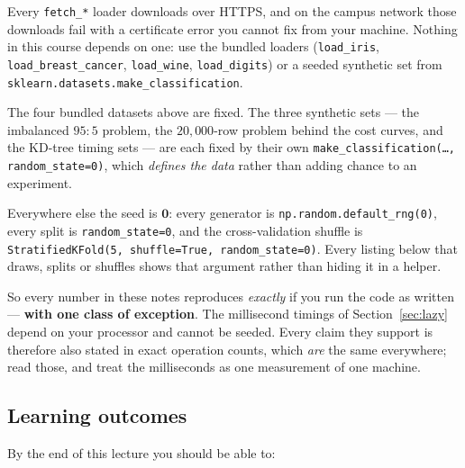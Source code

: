 \documentclass[11pt]{article}
\begin{document}
\begin{caution}
Every \texttt{fetch\_*} loader downloads over HTTPS, and on the campus network
those downloads fail with a certificate error you cannot fix from your machine.
Nothing in this course depends on one: use the bundled loaders
(\texttt{load\_iris}, \texttt{load\_breast\_cancer}, \texttt{load\_wine},
\texttt{load\_digits}) or a seeded synthetic set from
\texttt{sklearn.datasets.make\_classification}.
\end{caution}

\begin{keyidea}
The four bundled datasets above are fixed. The three synthetic sets --- the
imbalanced $95{:}5$ problem, the $20{,}000$-row problem behind the cost
curves, and the KD-tree timing sets --- are each fixed by their own
\texttt{make\_classification(\dots, random\_state=0)}, which \emph{defines
the data} rather than adding chance to an experiment.

Everywhere else the seed is $\mathbf{0}$: every generator is
\texttt{np.random.default\_rng(0)}, every split is
\texttt{random\_state=0}, and the cross-validation shuffle is
\texttt{StratifiedKFold(5, shuffle=True, random\_state=0)}. Every listing
below that draws, splits or shuffles shows that argument rather than hiding it
in a helper.

So every number in these notes reproduces \emph{exactly} if you run the code
as written --- \textbf{with one class of exception}. The millisecond timings
of Section~\ref{sec:lazy} depend on your processor and cannot be seeded. Every
claim they support is therefore also stated in exact operation counts, which
\emph{are} the same everywhere; read those, and treat the milliseconds as one
measurement of one machine.
\end{keyidea}

\subsection{Learning outcomes}

By the end of this lecture you should be able to:
\end{document}
